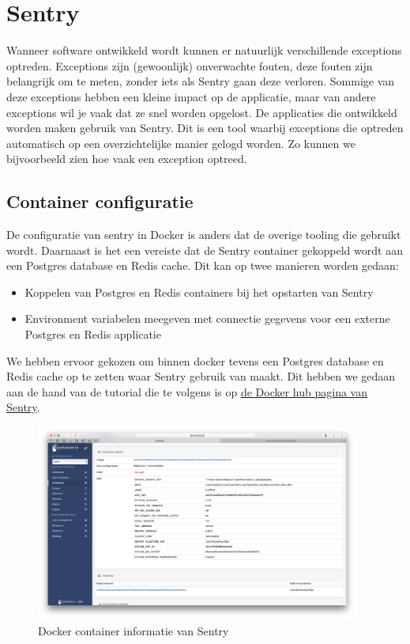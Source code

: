 \chapter{Sentry}
Wanneer software ontwikkeld wordt kunnen er natuurlijk verschillende exceptions optreden. Exceptions zijn (gewoonlijk) onverwachte fouten, deze fouten zijn belangrijk om te meten, zonder iets als Sentry gaan deze verloren. Sommige van deze exceptions hebben een kleine impact op de applicatie, maar van andere exceptions wil je vaak dat ze snel worden opgelost.
\newline
De applicaties die ontwikkeld worden maken gebruik van Sentry. Dit is een tool waarbij exceptions die optreden automatisch op een overzichtelijke manier gelogd worden. Zo kunnen we bijvoorbeeld zien hoe vaak een exception optreed.

\section{Container configuratie}
De configuratie van sentry in Docker is anders dat de overige tooling die gebruikt wordt. Daarnaast is het een vereiste dat de Sentry container gekoppeld wordt aan een Postgres database en Redis cache. Dit kan op twee manieren worden gedaan:

\begin{itemize}
	\setlength\itemsep{0em}
	\item Koppelen van Postgres en Redis containers bij het opstarten van Sentry
	\item Environment variabelen meegeven met connectie gegevens voor een externe Postgres en Redis applicatie
\end{itemize}

We hebben ervoor gekozen om binnen docker tevens een Postgres database en Redis cache op te zetten waar Sentry gebruik van maakt. Dit hebben we gedaan aan de hand van de tutorial die te volgens is op \href{https://hub.docker.com/_/sentry/}{de Docker hub pagina van Sentry}.
\newline
\begin{figure}[H]
	\centering
	\includegraphics[width=0.95\textwidth]{img/SentryDockerContainer.png}
	\caption{Docker container informatie van Sentry}
	\label{fig:SentryDockerContainer}
\end{figure}

